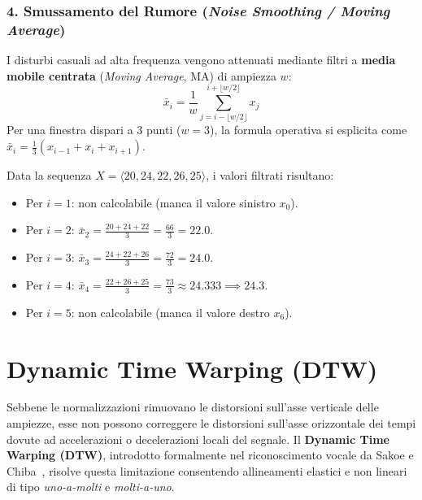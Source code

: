 \subsubsection{4. Smussamento del Rumore (\textit{Noise Smoothing / Moving Average})}
I disturbi casuali ad alta frequenza vengono attenuati mediante filtri a \textbf{media mobile centrata} (\textit{Moving Average}, MA) di ampiezza $w$:
\begin{equation}
\label{eq:ts-moving-average}
\bar{x}_i = \frac{1}{w} \sum_{j = i - \lfloor w/2 \rfloor}^{i + \lfloor w/2 \rfloor} x_j
\end{equation}
Per una finestra dispari a 3 punti ($w=3$), la formula operativa si esplicita come $\bar{x}_i = \frac{1}{3}(x_{i-1} + x_i + x_{i+1})$.

\begin{example}[Calcolo della Media Mobile Centrata con $w=3$]
\label{ex:moving-average-calc}
Data la sequenza $X = \langle 20, 24, 22, 26, 25 \rangle$, i valori filtrati risultano:
\begin{itemize}
    \item Per $i=1$: non calcolabile (manca il valore sinistro $x_0$).
    \item Per $i=2$: $\bar{x}_2 = \frac{20 + 24 + 22}{3} = \frac{66}{3} = 22.0$.
    \item Per $i=3$: $\bar{x}_3 = \frac{24 + 22 + 26}{3} = \frac{72}{3} = 24.0$.
    \item Per $i=4$: $\bar{x}_4 = \frac{22 + 26 + 25}{3} = \frac{73}{3} \approx 24.333 \implies 24.3$.
    \item Per $i=5$: non calcolabile (manca il valore destro $x_6$).
\end{itemize}
\end{example}

\FloatBarrier
\section{Dynamic Time Warping (DTW)}
\label{sec:ts-dynamic-time-warping}

Sebbene le normalizzazioni rimuovano le distorsioni sull'asse verticale delle ampiezze, esse non possono correggere le distorsioni sull'asse orizzontale dei tempi dovute ad accelerazioni o decelerazioni locali del segnale. Il \textbf{Dynamic Time Warping (DTW)}, introdotto formalmente nel riconoscimento vocale da Sakoe e Chiba~\cite{sakoe1978}, risolve questa limitazione consentendo allineamenti elastici e non lineari di tipo \textit{uno-a-molti} e \textit{molti-a-uno}.


